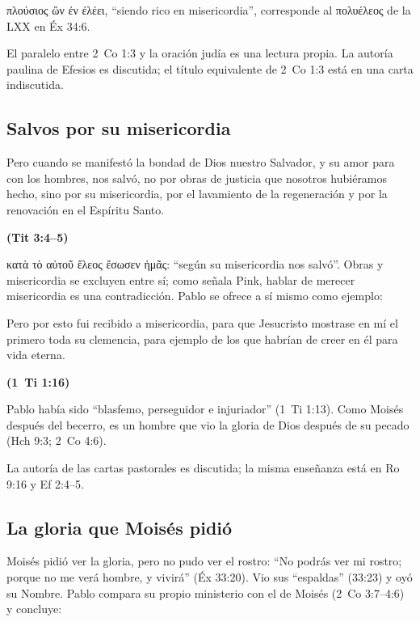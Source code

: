 \documentclass[11pt,letterpaper]{article}
\newcommand{\grc}[1]{\foreignlanguage{ancientgreek}{#1}}
\newcommand{\fuente}[1]{\par\hfill{\upshape\bfseries\small\textcolor{azul}{#1}}}
\begin{document}
\grc{πλούσιος ὢν ἐν ἐλέει}, ``siendo rico en misericordia'', corresponde al \grc{πολυέλεος} de la LXX en Éx 34:6.

\begin{nota}[Precisión]
El paralelo entre 2~Co 1:3 y la oración judía es una lectura propia. La autoría paulina de Efesios es discutida; el título equivalente de 2~Co 1:3 está en una carta indiscutida.
\end{nota}

\subsection{Salvos por su misericordia}
\begin{cita}Pero cuando se manifestó la bondad de Dios nuestro Salvador, y su amor para con los hombres, nos salvó, no por obras de justicia que nosotros hubiéramos hecho, sino por su misericordia, por el lavamiento de la regeneración y por la renovación en el Espíritu Santo.\fuente{(Tit 3:4--5)}\end{cita}

\grc{κατὰ τὸ αὐτοῦ ἔλεος ἔσωσεν ἡμᾶς}: ``según su misericordia nos salvó''. Obras y misericordia se excluyen entre sí; como señala Pink, hablar de merecer misericordia es una contradicción. Pablo se ofrece a sí mismo como ejemplo:

\begin{cita}Pero por esto fui recibido a misericordia, para que Jesucristo mostrase en mí el primero toda su clemencia, para ejemplo de los que habrían de creer en él para vida eterna.\fuente{(1~Ti 1:16)}\end{cita}

Pablo había sido ``blasfemo, perseguidor e injuriador'' (1~Ti 1:13). Como Moisés después del becerro, es un hombre que vio la gloria de Dios después de su pecado (Hch 9:3; 2~Co 4:6).

\begin{nota}[Precisión]
La autoría de las cartas pastorales es discutida; la misma enseñanza está en Ro 9:16 y Ef 2:4--5.
\end{nota}

\subsection{La gloria que Moisés pidió}
Moisés pidió ver la gloria, pero no pudo ver el rostro: ``No podrás ver mi rostro; porque no me verá hombre, y vivirá'' (Éx 33:20). Vio sus ``espaldas'' (33:23) y oyó su Nombre. Pablo compara su propio ministerio con el de Moisés (2~Co 3:7--4:6) y concluye:
\end{document}

